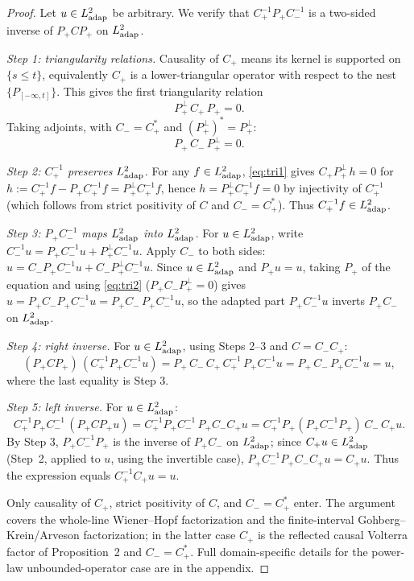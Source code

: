 \documentclass[11pt]{article}
\newcommand{\adap}{{\rm adap}}
\theoremstyle{plain}
\begin{document}
\begin{proof}
Let $u\in L^2_{\adap}$ be arbitrary. We verify that $C_+^{-1}P_+C_-^{-1}$ is a two-sided inverse of $P_+CP_+$ on $L^2_{\adap}$.

\emph{Step 1: triangularity relations.}
Causality of $C_+$ means its kernel is supported on $\{s\le t\}$, equivalently $C_+$ is a lower-triangular operator with respect to the nest $\{P_{[{-\infty},t]}\}$. This gives the first triangularity relation
\begin{equation}\label{eq:tri1}
P_+^\perp\, C_+\, P_+ = 0.
\end{equation}
Taking adjoints, with $C_-=C_+^*$ and $(P_+^\perp)^* = P_+^\perp$:
\begin{equation}\label{eq:tri2}
P_+\, C_-\, P_+^\perp = 0.
\end{equation}

\emph{Step 2: $C_+^{-1}$ preserves $L^2_{\adap}$.}
For any $f\in L^2_{\adap}$, \eqref{eq:tri1} gives $C_+ P_+^\perp\, h = 0$ for $h := C_+^{-1}f - P_+ C_+^{-1}f = P_+^\perp C_+^{-1}f$, hence $h = P_+^\perp C_+^{-1}f = 0$ by injectivity of $C_+^{-1}$ (which follows from strict positivity of $C$ and $C_- = C_+^*$). Thus $C_+^{-1}f\in L^2_{\adap}$.

\emph{Step 3: $P_+C_-^{-1}$ maps $L^2_{\adap}$ into $L^2_{\adap}$.}
For $u\in L^2_{\adap}$, write $C_-^{-1}u = P_+ C_-^{-1}u + P_+^\perp C_-^{-1}u$. Apply $C_-$ to both sides: $u = C_- P_+ C_-^{-1}u + C_- P_+^\perp C_-^{-1}u$. Since $u\in L^2_{\adap}$ and $P_+u=u$, taking $P_+$ of the equation and using \eqref{eq:tri2} ($P_+ C_- P_+^\perp = 0$) gives $u = P_+ C_- P_+ C_-^{-1}u = P_+ C_-\, P_+ C_-^{-1}u$, so the adapted part $P_+ C_-^{-1}u$ inverts $P_+ C_-$ on $L^2_{\adap}$.

\emph{Step 4: right inverse.}
For $u\in L^2_{\adap}$, using Steps 2--3 and $C = C_-C_+$:
\[
(P_+CP_+)\,(C_+^{-1}P_+C_-^{-1}u)
= P_+\,C_-\,C_+\,C_+^{-1}\,P_+C_-^{-1}u
= P_+\,C_-\,P_+C_-^{-1}u
= u,
\]
where the last equality is Step 3.

\emph{Step 5: left inverse.}
For $u\in L^2_{\adap}$:
\[
C_+^{-1}P_+C_-^{-1}\,(P_+CP_+u)
= C_+^{-1}P_+C_-^{-1}\,P_+C_-C_+u
= C_+^{-1}P_+(P_+C_-^{-1}P_+)\,C_-\,C_+u.
\]
By Step 3, $P_+C_-^{-1}P_+$ is the inverse of $P_+C_-$ on $L^2_{\adap}$; since $C_+u\in L^2_{\adap}$ (Step~2, applied to $u$, using the invertible case), $P_+C_-^{-1}P_+C_-C_+u = C_+u$. Thus the expression equals $C_+^{-1}C_+u = u$.

Only causality of $C_+$, strict positivity of $C$, and $C_-=C_+^*$ enter. The argument covers the whole-line Wiener--Hopf factorization and the finite-interval Gohberg--Krein/Arveson factorization; in the latter case $C_+$ is the reflected causal Volterra factor of Proposition~2 and $C_- = C_+^*$. Full domain-specific details for the power-law unbounded-operator case are in the appendix.
\end{proof}
\end{document}
